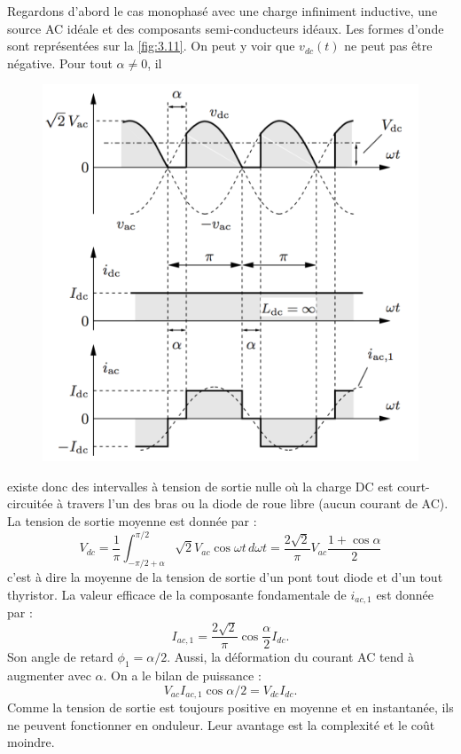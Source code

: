 		Regardons d'abord le cas monophasé avec une charge infiniment inductive, une source AC idéale et des composants semi-conducteurs idéaux. Les formes d'onde sont représentées sur la \autoref{fig:3.11}. On peut y voir que $v_{dc}(t)$ ne peut pas être négative. Pour tout $\alpha \neq 0$, il 
		
		\begin{figure}
		\vspace{-5mm}
		\includegraphics[scale=0.28]{ch3/11}
		\label{fig:3.11}
		\end{figure}
		existe donc des intervalles à tension de sortie nulle où la charge DC est court-circuitée à travers l'un des bras ou la diode de roue libre (aucun courant de AC). La tension de sortie moyenne est donnée par : 
		\begin{equation}
			V_{dc} = \frac{1}{\pi} \int _{-\pi /2 +\alpha} ^{\pi /2} \sqrt{2} V_{ac} \cos \omega t \, d\omega t = \frac{2\sqrt{2}}{\pi} V_{ac} \frac{1+\cos \alpha}{2}
		\end{equation}
		c'est à dire la moyenne de la tension de sortie d'un pont tout diode et d'un tout thyristor. La valeur efficace de la composante fondamentale de $i_{ac,1}$ est donnée par : 
		\begin{equation}
			I_{ac,1} = \frac{2\sqrt{2}}{\pi} \cos \frac{\alpha}{2} I_{dc}.
		\end{equation}
		Son angle de retard $\phi _1 = \alpha /2$. Aussi, la déformation du courant AC tend à augmenter avec $\alpha$. On a le bilan de puissance : 
		\begin{equation}
			V_{ac}I_{ac,1}\cos\alpha /2= V_{dc}I_{dc}. 
		\end{equation}
		Comme la tension de sortie est toujours positive en moyenne et en instantanée, ils ne peuvent fonctionner en onduleur. Leur avantage est la complexité et le coût moindre. \\
		
